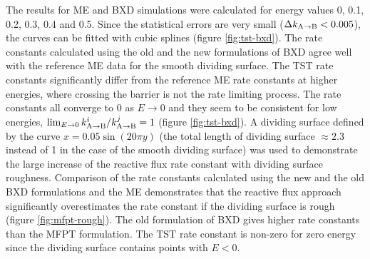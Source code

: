 The results for ME and BXD simulations were calculated for energy values 0, 0.1, 0.2, 0.3, 0.4 and 0.5. 
Since the statistical errors are very small ($\Delta k_{\rm A \rightarrow B} < 0.005$), the curves can be fitted with cubic splines (figure \ref{fig:tst-bxd}). 
The rate constants calculated using the old and the new formulations of BXD agree well with the reference ME data for the smooth dividing surface.
The TST rate constants significantly differ from the reference ME rate constants at higher energies, where crossing the barrier is not the rate limiting process.
The rate constants all converge to 0 as $E \rightarrow 0$ and they seem to be consistent for low energies, $\lim_{E \rightarrow 0} k^i_{\rm A \rightarrow B} / k^j_{\rm A \rightarrow B} = 1$ (figure \ref{fig:tst-bxd}).
A dividing surface defined by the curve $x = 0.05 \sin (20 \pi y)$ (the total length of dividing surface $\approx 2.3 $ instead of 1 in the case of the smooth dividing surface) was used to demonstrate the large increase of the reactive flux rate constant with dividing surface roughness.
Comparison of the rate constants calculated using the new and the old BXD formulations and the ME demonstrates that the reactive flux approach significantly overestimates the rate constant if the dividing surface is rough (figure \ref{fig:mfpt-rough}).
The old formulation of BXD gives higher rate constants than the MFPT formulation.
The TST rate constant is non-zero for zero energy since the dividing surface contains points with $E<0$.

